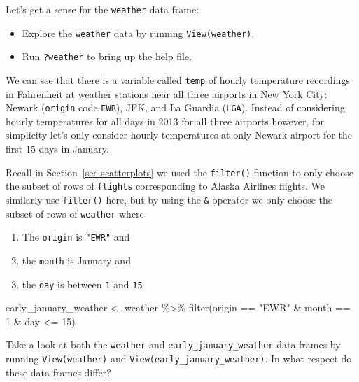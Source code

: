 \documentclass[
  letterpaper,
  DIV=11,
  numbers=noendperiod]{scrreprt}
\newenvironment{Shaded}{\begin{snugshade}}{\end{snugshade}}
\newcommand{\DecValTok}[1]{\textcolor[rgb]{0.68,0.00,0.00}{#1}}
\newcommand{\FunctionTok}[1]{\textcolor[rgb]{0.28,0.35,0.67}{#1}}
\newcommand{\NormalTok}[1]{\textcolor[rgb]{0.00,0.23,0.31}{#1}}
\newcommand{\OtherTok}[1]{\textcolor[rgb]{0.00,0.23,0.31}{#1}}
\newcommand{\SpecialCharTok}[1]{\textcolor[rgb]{0.37,0.37,0.37}{#1}}
\newcommand{\StringTok}[1]{\textcolor[rgb]{0.13,0.47,0.30}{#1}}
\providecommand{\tightlist}{%
  \setlength{\itemsep}{0pt}\setlength{\parskip}{0pt}}\usepackage{longtable,booktabs,array}
\theoremstyle{definition}
\theoremstyle{remark}
\begin{document}
Let's get a sense for the \texttt{weather} data frame:

\begin{itemize}
\tightlist
\item
  Explore the \texttt{weather} data by running \texttt{View(weather)}.
\item
  Run \texttt{?weather} to bring up the help file.
\end{itemize}

We can see that there is a variable called \texttt{temp} of hourly
temperature recordings in Fahrenheit at weather stations near all three
airports in New York City: Newark (\texttt{origin} code \texttt{EWR}),
JFK, and La Guardia (\texttt{LGA}). Instead of considering hourly
temperatures for all days in 2013 for all three airports however, for
simplicity let's only consider hourly temperatures at only Newark
airport for the first 15 days in January.

Recall in Section~\ref{sec-scatterplots} we used the \texttt{filter()}
function to only choose the subset of rows of \texttt{flights}
corresponding to Alaska Airlines flights. We similarly use
\texttt{filter()} here, but by using the \texttt{\&} operator we only
choose the subset of rows of \texttt{weather} where

\begin{enumerate}
\def\labelenumi{\arabic{enumi}.}
\tightlist
\item
  The \texttt{origin} is \texttt{"EWR"} and
\item
  the \texttt{month} is January and
\item
  the \texttt{day} is between \texttt{1} and \texttt{15}
\end{enumerate}

\begin{Shaded}
\begin{Highlighting}[]
\NormalTok{early\_january\_weather }\OtherTok{\textless{}{-}}\NormalTok{ weather }\SpecialCharTok{\%\textgreater{}\%} 
  \FunctionTok{filter}\NormalTok{(origin }\SpecialCharTok{==} \StringTok{"EWR"} \SpecialCharTok{\&}\NormalTok{ month }\SpecialCharTok{==} \DecValTok{1} \SpecialCharTok{\&}\NormalTok{ day }\SpecialCharTok{\textless{}=} \DecValTok{15}\NormalTok{)}
\end{Highlighting}
\end{Shaded}

\begin{tcolorbox}[enhanced jigsaw, coltitle=black, toprule=.15mm, bottomtitle=1mm, breakable, leftrule=.75mm, title={{🎯} Learning Check 2.9}, opacitybacktitle=0.6, colback=white, rightrule=.15mm, opacityback=0, toptitle=1mm, colbacktitle=quarto-callout-tip-color!10!white, colframe=quarto-callout-tip-color-frame, titlerule=0mm, arc=.35mm, bottomrule=.15mm, left=2mm]
Take a look at both the \texttt{weather} and
\texttt{early\_january\_weather} data frames by running
\texttt{View(weather)} and \texttt{View(early\_january\_weather)}. In
what respect do these data frames differ?
\end{tcolorbox}
\end{document}

